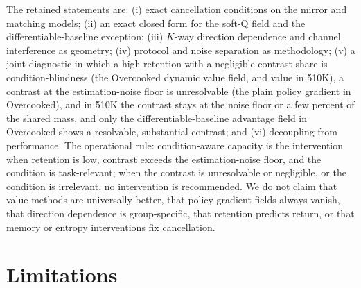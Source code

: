 \documentclass{article}
\begin{document}
The retained statements are: (i) exact cancellation conditions on the mirror
and matching models; (ii) an exact closed form for the soft-Q field and the
differentiable-baseline exception; (iii) $K$-way direction dependence and
channel interference as geometry; (iv) protocol and noise separation as
methodology; (v) a joint diagnostic in which a high retention with a
negligible contrast share is condition-blindness (the Overcooked dynamic
value field, and value in 510K), a contrast at the estimation-noise floor is
unresolvable (the plain policy gradient in Overcooked), and in 510K the
contrast stays at the noise floor or a few percent of the shared mass, and
only the differentiable-baseline advantage
field in Overcooked shows a resolvable, substantial contrast; and (vi)
decoupling from performance. The operational rule: condition-aware capacity is
the intervention when retention is low, contrast exceeds the estimation-noise
floor, and the condition is task-relevant; when the contrast is unresolvable
or negligible, or the condition is irrelevant, no intervention is
recommended. We do not claim that value methods are universally better, that
policy-gradient fields always vanish, that direction dependence is
group-specific, that retention predicts return, or that memory or entropy
interventions fix cancellation.

\section{Limitations}
\label{sec:limitations}
\end{document}
